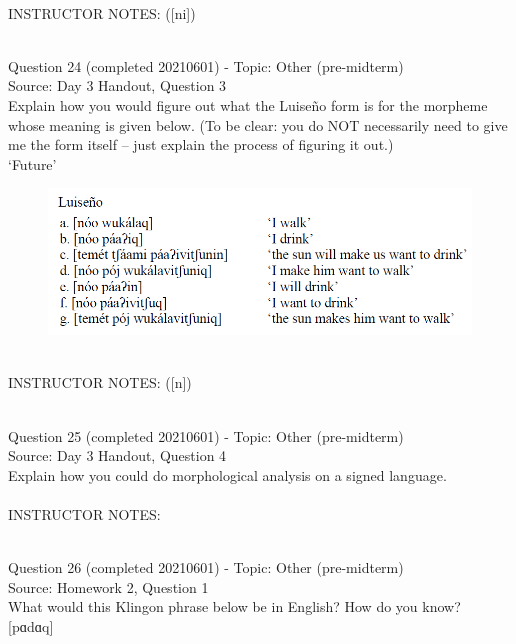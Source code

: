 \documentclass[12pt]{article}
\begin{document}
~\\
INSTRUCTOR NOTES: ([ni])


~\\

{\large Question 24} (completed 20210601) - Topic: Other (pre-midterm)\\
Source: Day 3 Handout, Question 3\\

Explain how you would figure out what the Luiseño form is for the morpheme whose meaning is given below. (To be clear: you do NOT necessarily need to give me the form itself -- just explain the process of figuring it out.)\\

‘Future’

\begin{figure}[H]
\includegraphics{../images/luiseno.png}
\end{figure}

~\\
INSTRUCTOR NOTES: ([n])


~\\

{\large Question 25} (completed 20210601) - Topic: Other (pre-midterm)\\
Source: Day 3 Handout, Question 4\\

Explain how you could do morphological analysis on a signed language.\\


~\\
INSTRUCTOR NOTES: 


~\\

{\large Question 26} (completed 20210601) - Topic: Other (pre-midterm)\\
Source: Homework 2, Question 1\\

What would this Klingon phrase below be in English? How do you know?\\

{[pɑdɑq]}
\end{document}
